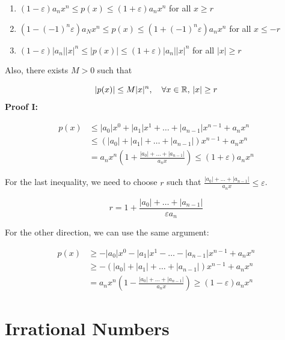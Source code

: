 \begin{enumerate}

	\item \((1 - \varepsilon) a_n x^n \le p(x) \le (1 + \varepsilon) a_n x^n\) for all \(x \ge r\)

	\item \((1 - (-1)^n \varepsilon) a_N x^n \le p(x) \le (1 + (-1)^n \varepsilon) a_n x^n\) for all \(x \le -r\)

	\item \((1 - \varepsilon)|a_n||x|^n \le |p(x)| \le (1 + \varepsilon) |a_n| |x|^n\) for all \(|x| \ge r\)

\end{enumerate}

Also, there exists \(M > 0\) such that

\[
	|p(x)| \le M |x|^n, \quad \forall x \in \mathbb{R}, \, |x| \ge r
\]
\textbf{Proof I:}

\begin{align*}
	p(x) & \le |a_0| x^0 + |a_1| x^1 + \ldots + |a_{n - 1}|x^{n - 1} + a_n x^n                                \\
	     & \le (|a_0| + |a_1| + \ldots + |a_{n - 1}|) x^{n - 1} + a_n x^n                                     \\
	     & = a_n x^n \left(1 + \frac{|a_0| + \dots + |a_{n - 1}|}{a_n x}\right) \le (1 + \varepsilon) a_n x^n
\end{align*}

For the last inequality, we need to choose \(r\) such that \(\frac{|a_0| + \ldots + |a_{n - 1}|}{a_n x} \le \varepsilon\).

\[
	r = 1 + \frac{|a_0| + \ldots + |a_{n - 1}|}{\varepsilon a_n}
\]

For the other direction, we can use the same argument:

\begin{align*}
	p(x) & \ge -|a_0| x^0 - |a_1| x^1 - \ldots - |a_{n - 1}|x^{n - 1} + a_n x^n                               \\
	     & \ge -(|a_0| + |a_1| + \ldots + |a_{n - 1}|) x^{n - 1} + a_n x^n                                    \\
	     & = a_n x^n \left(1 - \frac{|a_0| + \dots + |a_{n - 1}|}{a_n x}\right) \ge (1 - \varepsilon) a_n x^n
\end{align*}

\QED

\section{Irrational Numbers}

